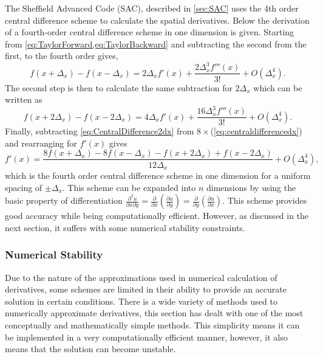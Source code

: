 The Sheffield Advanced Code (SAC), described in \cref{sec:SAC} uses the 4th order central difference scheme to calculate the spatial derivatives.
Below the derivation of a fourth-order central difference scheme in one dimension is given.
Starting from \cref{eq:TaylorForward,eq:TaylorBackward} and subtracting the second from the first, to the fourth order gives,
\begin{equation}
f(x+\Delta_{x})-f(x-\Delta_{x})=2\Delta_{x}f'(x)+\frac{2\Delta_{x}^{3}f'''(x)}{3!}+O(\Delta_{x}^{4}).\label{eq:centraldifferencedx}
\end{equation}
The second step is then to calculate the same subtraction for $2\Delta_{x}$ which can be written as
\begin{equation}
f(x+2\Delta_{x})-f(x-2\Delta_{x})=4\Delta_{x}f'(x)+\frac{16\Delta_{x}^{3}f'''(x)}{3!}+O(\Delta_{x}^{4}).\label{eq:CentralDifference2dx}
\end{equation}
Finally, subtracting \cref{eq:CentralDifference2dx} from $8\times$(\cref{eq:centraldifferencedx}) and rearranging for $f'(x)$ gives
\begin{equation}
f'(x)=\frac{8f(x+\Delta_{x})-8f(x-\Delta_{x})-f(x+2\Delta_{x})+f(x-2\Delta_{x})}{12\Delta_{x}}+O(\Delta_{x}^{4}),\label{eq:4thOrderCentralDifferenceUniform}
\end{equation}
which is the fourth order central difference scheme in one dimension for a uniform spacing of $\pm\Delta_{x}$.
This scheme can be expanded into $n$ dimensions by using the basic property of differentiation $\frac{\partial^{2}u}{\partial x\partial y}=\frac{\partial}{\partial x}\left(\frac{\partial u}{\partial y}\right)=\frac{\partial}{\partial y}\left(\frac{\partial u}{\partial x}\right)$.
This scheme provides good accuracy while being computationally efficient.
However, as discussed in the next section, it suffers with some numerical stability constraints.


\subsubsection{Numerical Stability}

Due to the nature of the approximations used in numerical calculation of derivatives, some schemes are limited in their ability to provide an accurate solution in certain conditions.
There is a wide variety of methods used to numerically approximate derivatives, this section has dealt with one of the most conceptually and mathematically simple methods.
This simplicity means it can be implemented in a very computationally efficient manner, however, it also means that the solution can become unstable.

